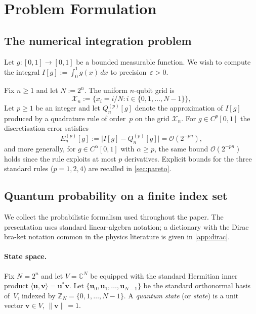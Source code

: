 \documentclass[12pt,a4paper]{article}
\theoremstyle{plain}
\theoremstyle{definition}
\theoremstyle{remark}
\begin{document}
\section{Problem Formulation}
\label{sec:problem}

\subsection{The numerical integration problem}

Let $g:[0,1]\to[0,1]$ be a bounded measurable function.
We wish to compute the integral $I[g] := \int_0^1 g(x)\,dx$ to
precision~$\varepsilon > 0$.

Fix $n \geq 1$ and let $N := 2^n$.
The uniform $n$-qubit grid is
\begin{equation}
  \mathcal{X}_n := \bigl\{x_i = i/N : i \in \{0,1,\ldots,N-1\}\bigr\},
  \label{eq:grid}
\end{equation}
Let $p \geq 1$ be an integer and let $Q_n^{(p)}[g]$ denote the approximation
of $I[g]$ produced by a quadrature rule of order~$p$ on the grid
$\mathcal{X}_n$.
For $g \in C^p[0,1]$ the discretisation error satisfies
\begin{equation}
  E_n^{(p)}[g]
  := \bigl|I[g] - Q_n^{(p)}[g]\bigr|
  = \mathcal{O}(2^{-pn}),
  \label{eq:disc_error}
\end{equation}
and more generally, for $g \in C^\alpha[0,1]$ with $\alpha \geq p$,
the same bound $\mathcal{O}(2^{-pn})$ holds since the rule exploits
at most $p$ derivatives.
Explicit bounds for the three standard rules ($p=1,2,4$) are recalled in
\cref{sec:pareto}.

\subsection{Quantum probability on a finite index set}
\label{subsec:qprob}

We collect the probabilistic formalism used throughout the paper.
The presentation uses standard linear-algebra notation;
a dictionary with the Dirac bra-ket notation common in the physics
literature is given in \cref{app:dirac}.

\paragraph{State space.}
Fix $N = 2^n$ and let $V = \mathbb{C}^N$ be equipped with the standard
Hermitian inner product $\langle \mathbf{u}, \mathbf{v}\rangle
= \mathbf{u}^* \mathbf{v}$.
Let $\{\mathbf{u}_0, \mathbf{u}_1, \ldots, \mathbf{u}_{N-1}\}$ be the
standard orthonormal basis of~$V$, indexed by $\mathbb{Z}_N =
\{0,1,\ldots,N-1\}$.
A \emph{quantum state} (or \emph{state}) is a unit vector $\mathbf{v} \in V$,
$\|\mathbf{v}\| = 1$.
\end{document}
